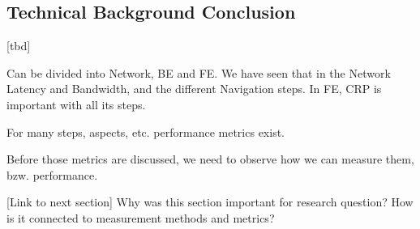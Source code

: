 








\subsection{Technical Background Conclusion}


[tbd]

Can be divided into Network, BE and FE.
We have seen that in the Network Latency and Bandwidth, and the different Navigation steps.
In FE, CRP is important with all its steps.

For many steps, aspects, etc. performance metrics exist.

Before those metrics are discussed, we need to observe how we can measure them, bzw. performance.

[Link to next section]
Why was this section important for research question?
How is it connected to measurement methods and metrics?








